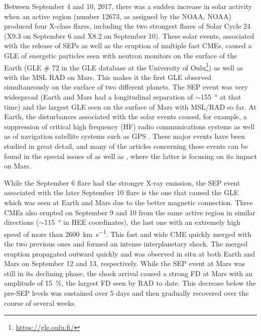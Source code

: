 Between September 4 and 10, 2017, there was a sudden increase in solar activity when an active region (number 12673, as assigned by the \acl{NOAA}, \acs{NOAA}) produced four X-class flares, including the two strongest flares of Solar Cycle 24 (X9.3 on September 6 and X8.2 on September 10).
These solar events, associated with the release of \acp{SEP} as well as the eruption of multiple fast \acp{CME}, caused a \ac{GLE} of energetic particles seen with neutron monitors on the surface of the Earth (\ac{GLE} \# 72 in the \ac{GLE} database at the University of Oulu\footnote{\url{https://gle.oulu.fi/}}) as well as with the \ac{MSL} \ac{RAD} on Mars. This makes it the first \ac{GLE} observed simultaneously on the surface of two different planets.
The \ac{SEP} event was very widespread (Earth and Mars had a longitudinal separation of $\sim$\SI{155}{\degree} at that time) and the largest \ac{GLE} seen on the surface of Mars with \ac{MSL}/\ac{RAD} so far. At Earth, the disturbances associated with the solar events caused, for example, a suppression of critical high frequency (HF) radio communications systems \citep{Frissell-2018,Bland-2018} as well as of navigation satellite systems such as GPS \citep{Berdermann-2018,Sato-2019}.
These major events have been studied in great detail, and many of the articles concerning these events can be found in the special issues of \citet{SpaceWeather-2018-special-issue-September-event} as well as \citet{GRL-2018-special-issue-September-event}, where the latter is focusing on its impact on Mars.

While the September 6 flare had the stronger X-ray emission, the \ac{SEP} event associated with the later September 10 flare is the one that caused the \ac{GLE} which was seen at Earth and Mars due to the better magnetic connection. Three \acp{CME} also erupted on September 9 and 10 from the same active region in similar directions ($\sim$\SI{115}{\degree} in \ac{HEE} coordinates), the last one with an extremely high speed of more than \SI{2600}{\kilo\meter\per\second}. This fast and wide \ac{CME} quickly merged with the two previous ones and formed an intense interplanetary shock. The merged eruption propagated outward quickly and was observed in situ at both Earth and Mars on September 12 and 13, respectively. While the \ac{SEP} event at Mars was still in its declining phase, the shock arrival caused a strong \ac{FD} at Mars with an amplitude of \SI{15}{\percent}, the largest \ac{FD} seen by \ac{RAD} to date. This decrease below the pre-\ac{SEP} levels was sustained over 5 days and then gradually recovered over the course of several weeks.

